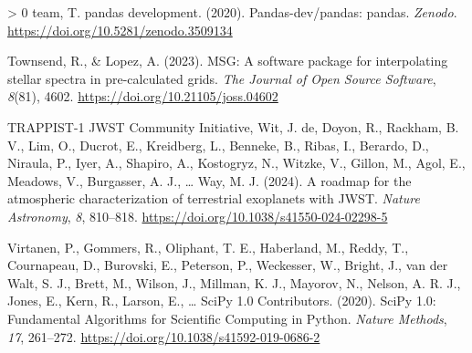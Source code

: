 \documentclass[10pt,a4paper,onecolumn]{article}
\newlength{\cslhangindent}
\newenvironment{CSLReferences}[3] %
 {%
  \setlength{\parindent}{0pt}
  \ifodd #1 \everypar{\setlength{\hangindent}{\cslhangindent}}\ignorespaces\fi
  \ifnum #2 > 0
  \setlength{\parskip}{#2\baselineskip}
  \fi
 }%
 {}
\begin{document}
\begin{CSLReferences}{1}{0}
\leavevmode\hypertarget{ref-pandas:2020}{}%
team, T. pandas development. (2020). Pandas-dev/pandas: pandas.
\emph{Zenodo}. \url{https://doi.org/10.5281/zenodo.3509134}

\leavevmode\hypertarget{ref-Townsend:2023}{}%
Townsend, R., \& Lopez, A. (2023). MSG: A software package for
interpolating stellar spectra in pre-calculated grids. \emph{The Journal
of Open Source Software}, \emph{8}(81), 4602.
\url{https://doi.org/10.21105/joss.04602}

\leavevmode\hypertarget{ref-TRAPPIST1_JWST_2024}{}%
TRAPPIST-1 JWST Community Initiative, Wit, J. de, Doyon, R., Rackham, B.
V., Lim, O., Ducrot, E., Kreidberg, L., Benneke, B., Ribas, I., Berardo,
D., Niraula, P., Iyer, A., Shapiro, A., Kostogryz, N., Witzke, V.,
Gillon, M., Agol, E., Meadows, V., Burgasser, A. J., \ldots{} Way, M. J.
(2024). A roadmap for the atmospheric characterization of terrestrial
exoplanets with JWST. \emph{Nature Astronomy}, \emph{8}, 810--818.
\url{https://doi.org/10.1038/s41550-024-02298-5}

\leavevmode\hypertarget{ref-2020SciPy-NMeth}{}%
Virtanen, P., Gommers, R., Oliphant, T. E., Haberland, M., Reddy, T.,
Cournapeau, D., Burovski, E., Peterson, P., Weckesser, W., Bright, J.,
van der Walt, S. J., Brett, M., Wilson, J., Millman, K. J., Mayorov, N.,
Nelson, A. R. J., Jones, E., Kern, R., Larson, E., \ldots{} SciPy 1.0
Contributors. (2020). {{SciPy} 1.0: Fundamental Algorithms for
Scientific Computing in Python}. \emph{Nature Methods}, \emph{17},
261--272. \url{https://doi.org/10.1038/s41592-019-0686-2}

\end{CSLReferences}
\end{document}
